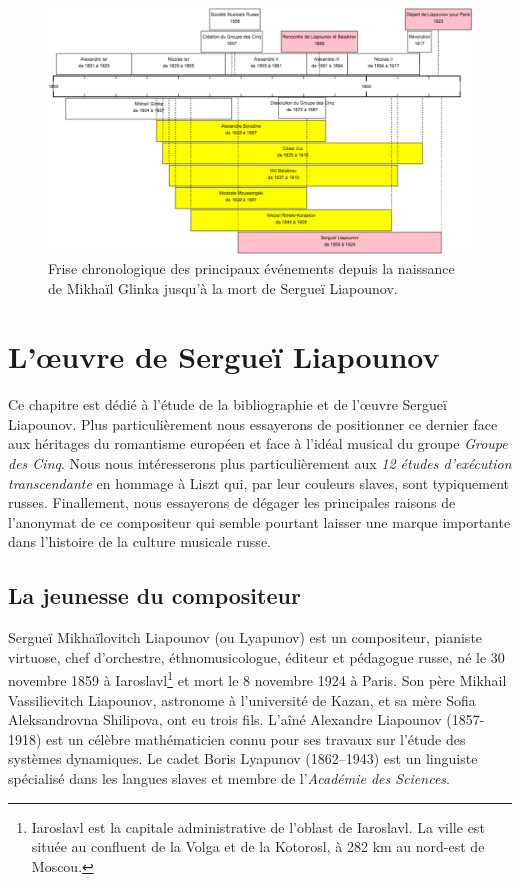 \begin{figure}[!ht]
  \begin{bigcenter}
    \includegraphics[width=15.5cm, keepaspectratio]{frise.png}
  \end{bigcenter}
  \caption{\label{frise}Frise chronologique des principaux événements depuis la naissance de Mikhaïl Glinka jusqu'à la mort de Sergueï Liapounov.}
\end{figure}


\chapter{L'œuvre de Sergueï Liapounov}

Ce chapitre est dédié à l'étude de la bibliographie et de l'œuvre Sergueï Liapounov. Plus particulièrement nous essayerons de positionner ce dernier face aux héritages du romantisme européen et face à l'idéal musical du groupe \emph{Groupe des Cinq}. Nous nous intéresserons plus particulièrement aux \emph{12 études d'exécution transcendante} en hommage à Liszt qui, par leur couleurs slaves, sont typiquement russes. Finallement, nous essayerons de dégager les principales raisons de l'anonymat de ce compositeur qui semble pourtant laisser une marque importante dans l'histoire de la culture musicale russe.

\section{La jeunesse du compositeur}

Sergueï Mikhaïlovitch Liapounov (ou Lyapunov) est un compositeur, pianiste virtuose, chef d'orchestre, éthnomusicologue, éditeur et pédagogue russe, né le 30 novembre 1859 à Iaroslavl\footnote{Iaroslavl est la capitale administrative de l'oblast de Iaroslavl. La ville est située au confluent de la Volga et de la Kotorosl, à 282 km au nord-est de Moscou.} et mort le 8 novembre 1924 à Paris. Son père Mikhail Vassilievitch Liapounov, astronome à l'université de Kazan, et sa mère Sofia Aleksandrovna Shilipova, ont eu trois fils. L'aîné Alexandre Liapounov (1857-1918) est un célèbre mathématicien connu pour ses travaux sur l'étude des systèmes dynamiques. Le cadet Boris Lyapunov (1862–1943) est un linguiste spécialisé dans les langues slaves et membre de l'\emph{Académie des Sciences}.

